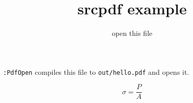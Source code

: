 \documentclass[11pt]{article}
\title{srcpdf example}
\author{open this file}
\date{}
\begin{document}
\maketitle

\texttt{:PdfOpen} compiles this file to \texttt{out/hello.pdf} and opens it.

\[
  \sigma = \frac{P}{A}
\]
\end{document}

